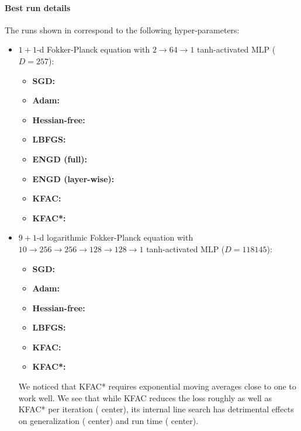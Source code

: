 \paragraph{Best run details} The runs shown in  correspond to the following hyper-parameters:
\begin{itemize}
\item $1+1$-d Fokker-Planck equation with $2 \to 64 \to 1$ tanh-activated MLP ($D=\num{257}$):
  \begin{itemize}
    \def\pathToRuns{kfac_pinns_exp/exp46_fokker_planck1d_isotropic_gaussian_random/tex}
  \item \textbf{SGD:} 
  \item \textbf{Adam:} 
  \item \textbf{Hessian-free:} 
  \item \textbf{LBFGS:} 
  \item \textbf{ENGD (full):} 
  \item \textbf{ENGD (layer-wise):} 
  \item \textbf{KFAC:} 
  \item \textbf{KFAC*:} 
  \end{itemize}

\item $9+1$-d logarithmic Fokker-Planck equation with $10 \to 256 \to 256 \to 128 \to 128 \to 1$ tanh-activated MLP ($D=\num{118145}$):
  \begin{itemize}
    \def\pathToRuns{kfac_pinns_exp/exp43_log_fokker_planck9d_isotropic_gaussian_random/tex}
  \item \textbf{SGD:} 
  \item \textbf{Adam:} 
  \item \textbf{Hessian-free:} 
  \item \textbf{LBFGS:} 
  \item \textbf{KFAC:} 
  \item \textbf{KFAC*:} 
  \end{itemize}
  We noticed that KFAC* requires exponential moving averages close to one to work well.
  We see that while KFAC reduces the loss roughly as well as KFAC* per iteration ( center), its internal line search has detrimental effects on generalization ( center) and run time ( center).


\end{itemize}
